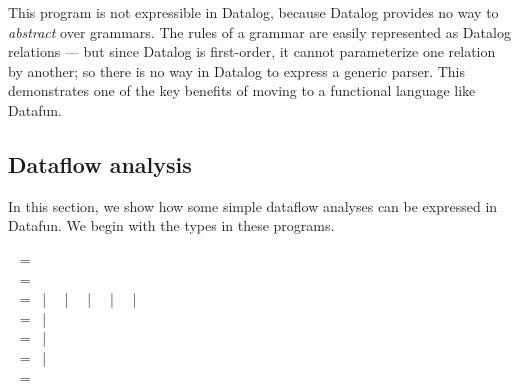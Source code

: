This program is not expressible in Datalog, because Datalog provides no way to
\emph{abstract} over grammars. The rules of a grammar are easily represented as
Datalog relations --- but since Datalog is first-order, it cannot parameterize
one relation by another; so there is no way in Datalog to express a generic
parser. This demonstrates one of the key benefits of moving to a functional
language like Datafun. %




\subsection{Dataflow analysis}
\label{dataflow-analysis}


In this section, we show how some simple dataflow analyses can be
expressed in Datafun. We begin with the types in these programs.

\begin{code}
  ~ = \tstring\\
  ~ = \tint\\
  ~ =  ~|~ 
  ~|~  ~|~  ~|~  ~|~ \\
  ~ =  \< ~|~  \<\tint\\
  ~ =
     \< ~|~
     \< \< \<\\
  ~ =
     \< \<
    ~|~  \< \< \<
  \\
  ~ = 
\end{code}

